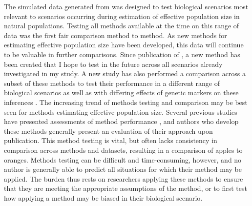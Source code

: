 The simulated data generated from  was designed to test biological scenarios most relevant to scenarios occurring during estimation of effective population size in natural populations. Testing all methods available at the time on this range of data was the first fair comparison method to method. As new methods for estimating effective population size have been developed, this data will continue to be valuable in further comparisons. Since publication of , a new method \citep{Hui:2015} has been created that I hope to test in the future across all scenarios already investigated in my study. A new study has also performed a comparison across a subset of these methods to test their performance in a different range of biological scenarios as well as with differing effects of genetic markers on these inferences \citep{Wang:2016}. The increasing trend of methods testing and comparison may be best seen for methods estimating effective population size. Several previous studies have presented assessments of method performance \citep{Ryman:2013, Neel:2013, Holleley:2013, Hoehn:2012, Barker:2011}, and authors who develop these methods generally present an evaluation of their approach upon publication. This method testing is vital, but often lacks consistency in comparison across methods and datasets, resulting in a comparison of apples to oranges. Methods testing can be difficult and time-consuming, however, and no author is generally able to predict all situations for which their method may be applied. The burden thus rests on researchers applying these methods to ensure that they are meeting the appropriate assumptions of the method, or to first test how applying a method may be biased in their biological scenario.


